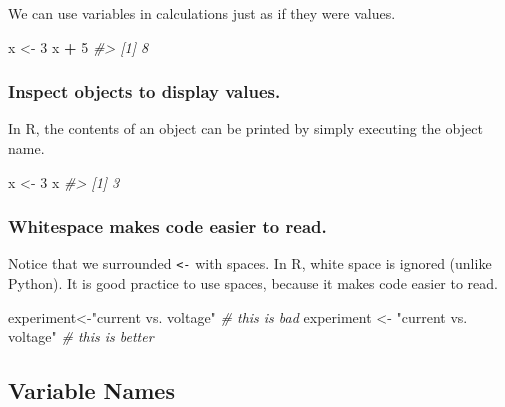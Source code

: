 \documentclass[]{book}
\newenvironment{Shaded}{\begin{snugshade}}{\end{snugshade}}
\newcommand{\DecValTok}[1]{\textcolor[rgb]{0.00,0.00,0.81}{#1}}
\newcommand{\StringTok}[1]{\textcolor[rgb]{0.31,0.60,0.02}{#1}}
\newcommand{\CommentTok}[1]{\textcolor[rgb]{0.56,0.35,0.01}{\textit{#1}}}
\newcommand{\OperatorTok}[1]{\textcolor[rgb]{0.81,0.36,0.00}{\textbf{#1}}}
\newcommand{\NormalTok}[1]{#1}
\begin{document}
We can use variables in calculations just as if they were values.

\begin{Shaded}
\begin{Highlighting}[]
\NormalTok{x <-}\StringTok{ }\DecValTok{3}
\NormalTok{x }\OperatorTok{+}\StringTok{ }\DecValTok{5}
\CommentTok{#> [1] 8}
\end{Highlighting}
\end{Shaded}

\subsubsection*{Inspect objects to display
values.}\label{inspect-objects-to-display-values.}

In R, the contents of an object can be printed by simply executing the
object name.

\begin{Shaded}
\begin{Highlighting}[]
\NormalTok{x <-}\StringTok{ }\DecValTok{3}
\NormalTok{x}
\CommentTok{#> [1] 3}
\end{Highlighting}
\end{Shaded}

\subsubsection*{Whitespace makes code easier to
read.}\label{whitespace-makes-code-easier-to-read.}

Notice that we surrounded \texttt{\textless{}-} with spaces. In R, white
space is ignored (unlike Python). It is good practice to use spaces,
because it makes code easier to read.

\begin{Shaded}
\begin{Highlighting}[]
\NormalTok{experiment<-}\StringTok{"current vs. voltage"}   \CommentTok{# this is bad}
\NormalTok{experiment <-}\StringTok{ "current vs. voltage"} \CommentTok{# this is better}
\end{Highlighting}
\end{Shaded}

\subsection{Variable Names}\label{variable-names}
\end{document}
